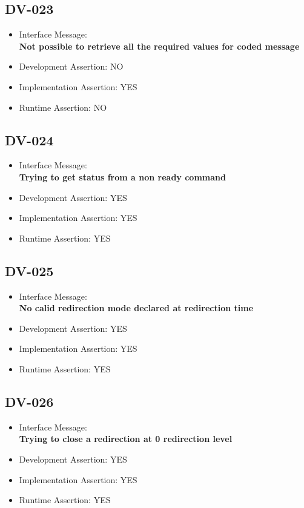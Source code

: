 \subsection{DV-023}
\begin{itemize}
  \item Interface Message:\\[1em]
    \textbf{Not possible to retrieve all the required values for coded message}
  \item Development Assertion: NO
  \item Implementation Assertion: YES
  \item Runtime Assertion: NO
\end{itemize}

\subsection{DV-024}
\begin{itemize}
  \item Interface Message:\\[1em]
    \textbf{Trying to get status from a non ready command}
  \item Development Assertion: YES
  \item Implementation Assertion: YES
  \item Runtime Assertion: YES
\end{itemize}

\subsection{DV-025}
\begin{itemize}
  \item Interface Message:\\[1em]
    \textbf{No calid redirection mode declared at redirection time}
  \item Development Assertion: YES
  \item Implementation Assertion: YES
  \item Runtime Assertion: YES
\end{itemize}

\subsection{DV-026}
\begin{itemize}
  \item Interface Message:\\[1em]
    \textbf{Trying to close a redirection at 0 redirection level}
  \item Development Assertion: YES
  \item Implementation Assertion: YES
  \item Runtime Assertion: YES
\end{itemize}

